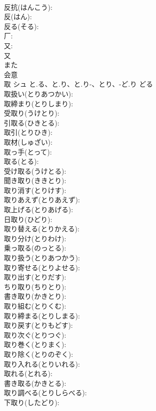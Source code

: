 \documentclass[8pt]{extreport}
\begin{document}
\begin{CJK}{UTF8}{min}
\\	反抗(はんこう): 
\\	反(はん): 
\\	反る(そる): 
\\	厂: 
\\	又: 
\\	又	
\\	また	
\\	会意 
\\	取	シュ	と.る、と.り、と.り-、とり、-ど.り	どる	
\\	取扱い(とりあつかい): 
\\	取締まり(とりしまり): 
\\	受取り(うけとり): 
\\	引取る(ひきとる): 
\\	取引(とりひき): 
\\	取材(しゅざい): 
\\	取っ手(とって): 
\\	取る(とる): 
\\	受け取る(うけとる): 
\\	聞き取り(ききとり): 
\\	取り消す(とりけす): 
\\	取りあえず(とりあえず): 
\\	取上げる(とりあげる): 
\\	日取り(ひどり): 
\\	取り替える(とりかえる): 
\\	取り分け(とりわけ): 
\\	乗っ取る(のっとる): 
\\	取り扱う(とりあつかう): 
\\	取り寄せる(とりよせる): 
\\	取り出す(とりだす): 
\\	ちり取り(ちりとり): 
\\	書き取り(かきとり): 
\\	取り組む(とりくむ): 
\\	取り締まる(とりしまる): 
\\	取り戻す(とりもどす): 
\\	取り次ぐ(とりつぐ): 
\\	取り巻く(とりまく): 
\\	取り除く(とりのぞく): 
\\	取り入れる(とりいれる): 
\\	取れる(とれる): 
\\	書き取る(かきとる): 
\\	取り調べる(とりしらべる): 
\\	下取り(したどり): 

\end{CJK}
\end{document}

